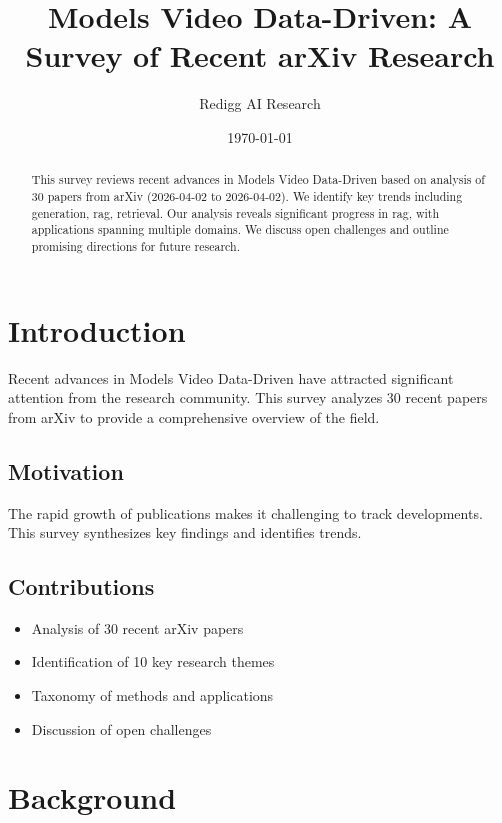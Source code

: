 \documentclass[11pt,a4paper]{article}
\title{Models Video Data-Driven: A Survey of Recent arXiv Research}
\author{Redigg AI Research}
\date{\today}
\begin{document}
\maketitle

\begin{abstract}
This survey reviews recent advances in Models Video Data-Driven based on analysis of 30 papers from arXiv (2026-04-02 to 2026-04-02). We identify key trends including generation, rag, retrieval. Our analysis reveals significant progress in rag, with applications spanning multiple domains. We discuss open challenges and outline promising directions for future research.
\end{abstract}


\section{Introduction}

Recent advances in Models Video Data-Driven have attracted significant attention from the research community. This survey analyzes 30 recent papers from arXiv to provide a comprehensive overview of the field.

\subsection{Motivation}

The rapid growth of publications makes it challenging to track developments. This survey synthesizes key findings and identifies trends.

\subsection{Contributions}

\begin{itemize}
    \item Analysis of 30 recent arXiv papers
    \item Identification of 10 key research themes
    \item Taxonomy of methods and applications
    \item Discussion of open challenges
\end{itemize}



\section{Background}
\end{document}
